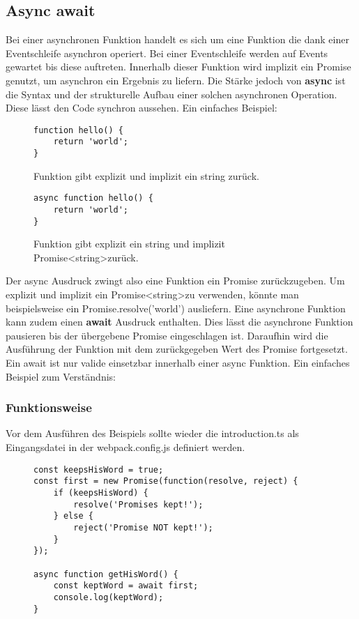 \subsection{Async await}
Bei einer asynchronen Funktion handelt es sich um eine Funktion die dank einer Eventschleife asynchron operiert. Bei einer Eventschleife werden auf Events gewartet bis diese auftreten. Innerhalb dieser Funktion wird implizit ein Promise genutzt, um asynchron ein Ergebnis zu liefern. Die Stärke jedoch von \textbf{async} ist die Syntax und der strukturelle Aufbau einer solchen asynchronen Operation. Diese lässt den Code synchron aussehen.\cite{async-await} Ein einfaches Beispiel:

\begin{figure}[H]
\begin{lstlisting}
function hello() {
    return 'world';
}
\end{lstlisting}
\caption{Funktion gibt explizit und implizit ein string zurück.}
\end{figure}

\begin{figure}[H]
\begin{lstlisting}
async function hello() {
    return 'world';
}
\end{lstlisting}
\caption{Funktion gibt explizit ein string und implizit Promise\textless string\textgreater zurück.}
\end{figure}

\noindent
Der async Ausdruck zwingt also eine Funktion ein Promise zurückzugeben. Um explizit und implizit ein Promise\textless string\textgreater zu verwenden, könnte man beispielsweise ein Promise.resolve('world') ausliefern. Eine asynchrone Funktion kann zudem einen \textbf{await} Ausdruck enthalten. Dies lässt die asynchrone Funktion pausieren bis der übergebene Promise eingeschlagen ist. Daraufhin wird die Ausführung der Funktion mit dem zurückgegeben Wert des Promise fortgesetzt. Ein await ist nur valide einsetzbar innerhalb einer async Funktion. Ein einfaches Beispiel zum Verständnis:\\

\subsubsection{Funktionsweise}

\noindent
Vor dem Ausführen des Beispiels sollte wieder die introduction.ts als Eingangsdatei in der webpack.config.js definiert werden.

\begin{figure}[H]
\begin{lstlisting}
const keepsHisWord = true;
const first = new Promise(function(resolve, reject) {
    if (keepsHisWord) {
        resolve('Promises kept!');
    } else {
        reject('Promise NOT kept!');
    }
});

async function getHisWord() {
    const keptWord = await first;
    console.log(keptWord);
}
\end{lstlisting}
\end{figure}

